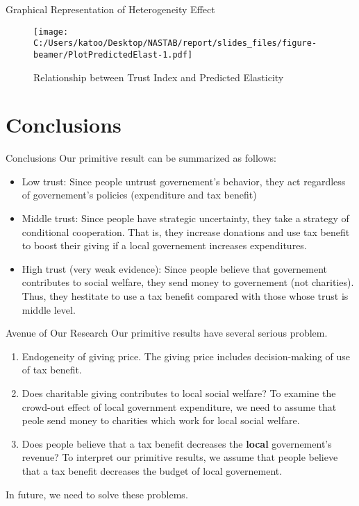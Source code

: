 \documentclass[
  ignorenonframetext,
]{beamer}
\providecommand{\tightlist}{%
  \setlength{\itemsep}{0pt}\setlength{\parskip}{0pt}}
\begin{document}
\begin{frame}{Graphical Representation of Heterogeneity Effect}
\protect\hypertarget{graphical-representation-of-heterogeneity-effect}{}
\begin{figure}
\centering
\texttt{[image: C:/Users/katoo/Desktop/NASTAB/report/slides\_files/figure-beamer/PlotPredictedElast-1.pdf]}
\caption{Relationship between Trust Index and Predicted Elasticity}
\end{figure}
\end{frame}

\hypertarget{conclusions}{%
\section{Conclusions}\label{conclusions}}

\begin{frame}{Conclusions}
\protect\hypertarget{conclusions-1}{}
Our primitive result can be summarized as follows:

\begin{itemize}
\tightlist
\item
  Low trust: Since people untrust governement's behavior, they act
  regardless of governement's policies (expenditure and tax benefit)
\item
  Middle trust: Since people have strategic uncertainty, they take a
  strategy of conditional cooperation. That is, they increase donations
  and use tax benefit to boost their giving if a local governement
  increases expenditures.
\item
  High trust (very weak evidence): Since people believe that governement
  contributes to social welfare, they send money to governement (not
  charities). Thus, they hestitate to use a tax benefit compared with
  those whose trust is middle level.
\end{itemize}
\end{frame}

\begin{frame}{Avenue of Our Research}
\protect\hypertarget{avenue-of-our-research}{}
Our primitive results have several serious problem.

\begin{enumerate}
\tightlist
\item
  Endogeneity of giving price. The giving price includes decision-making
  of use of tax benefit.
\item
  Does charitable giving contributes to local social welfare? To examine
  the crowd-out effect of local government expenditure, we need to
  assume that peole send money to charities which work for local social
  welfare.
\item
  Does people believe that a tax benefit decreases the \textbf{local}
  governement's revenue? To interpret our primitive results, we assume
  that people believe that a tax benefit decreases the budget of local
  governement.
\end{enumerate}

In future, we need to solve these problems.
\end{frame}
\end{document}
